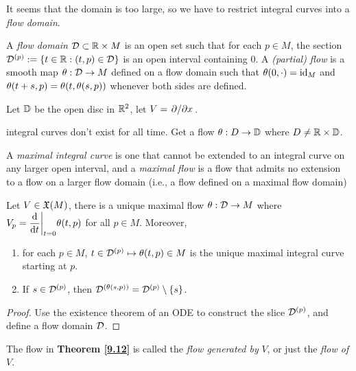 It seems that the domain is too large, so we have to restrict integral curves into a \textit{flow domain}.
\begin{definition}
    A \textit{flow domain} $\mathcal{D} \subset \mathbb{R} \times M$ is an open set such that  for each $p \in M$, the section $\mathcal{D}^{(p)} := \{t \in \mathbb{R}: (t,p) \in \mathcal{D}\}$ is an open interval containing $0$. 
    A \textit{(partial) flow} is a smooth map $\theta:\mathcal{D} \to M$ defined on a flow domain such that $\theta(0,\cdot) = \mathrm{id}_M$ and $\theta(t+s,p) = \theta(t, \theta(s,p))$ whenever both sides are defined. 
\end{definition}

\begin{example}
    Let $\mathbb{D}$ be the open disc in $\mathbb{R}^2$, let $V = \pdv*{}{x}$.
    
    integral curves don't exist for all time.
    Get a flow $\theta:D \to \mathbb{D}$ where $D \neq \mathbb{R} \times \mathbb{D}$.
\end{example}

\begin{definition}
    A \textit{maximal integral curve} is one that cannot be extended to an integral curve on any larger open interval, and a \textit{maximal flow} is a flow that admits no extension to a flow on a larger flow domain (i.e., a flow defined on a maximal flow domain)
\end{definition}

\begin{theorem}\label{9.12}
    Let $V \in \frak{X}(M)$, there is a unique maximal flow $\theta:\mathcal{D} \to M$ where $\displaystyle{V_p = \dv{}{t}\bigg|_{t=0} \theta(t,p)}$ for all $p \in M$. Moreover, 
    \begin{enumerate}
    \item for each $p \in M$, 
    $t \in \mathcal{D}^{(p)} \mapsto \theta(t,p) \in M$ is the unique maximal integral curve starting at $p$.
    \item If $s \in \mathcal{D}^{(p)}$, then $\mathcal{D}^{(\theta(s,p))} = \mathcal{D}^{(p)} \setminus \{s\}$.
    \end{enumerate}
\end{theorem}
\begin{proof}
    Use the existence theorem of an ODE to construct the slice $\mathcal{D}^{(p)}$, and define a flow domain $\mathcal{D}$.  
\end{proof}

\begin{definition}
    The flow in \textbf{Theorem \ref{9.12}} is called the \textit{flow generated by} $V$, or just the \textit{flow of} $V$. 
\end{definition}

